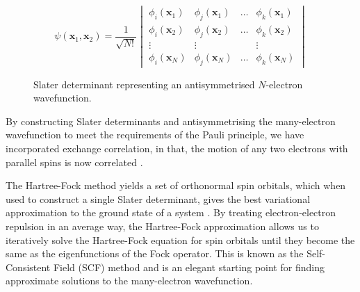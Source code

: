 \begin{figure}[H]
\centering
\begin{equation*}
\psi(\mathbf{x}_1, \mathbf{x}_2) =
%
\frac{1}{\sqrt{N!}} \begin{vmatrix}
\phi_i (\mathbf{x}_1) & \phi_j (\mathbf{x}_1) & \dots & \phi_k (\mathbf{x}_1) \\
\phi_i (\mathbf{x}_2) & \phi_j (\mathbf{x}_2) & \dots & \phi_k (\mathbf{x}_2) \\
\vdots & \vdots &   & \vdots \\
\phi_i (\mathbf{x}_N) & \phi_j (\mathbf{x}_N) & \dots & \phi_k (\mathbf{x}_N)
\end{vmatrix}
\end{equation*}
\caption{Slater determinant representing an antisymmetrised $N$-electron wavefunction.}
\end{figure}


By constructing Slater determinants and antisymmetrising the many-electron wavefunction to meet the requirements of the Pauli principle, we have incorporated exchange correlation, in that, the motion of any two electrons with parallel spins is now correlated \cite{Atilla1996}.

The Hartree-Fock method yields a set of orthonormal spin orbitals, which when used to construct a single Slater determinant, gives the best variational approximation to the ground state of a system \cite{Atilla1996}. By treating electron-electron repulsion in an average way, the Hartree-Fock approximation allows us to iteratively solve the Hartree-Fock equation for spin orbitals until they become the same as the eigenfunctions of the Fock operator. This is known as the Self-Consistent Field (SCF) method and is an elegant starting point for finding approximate solutions to the many-electron wavefunction.



